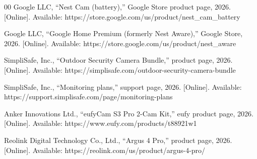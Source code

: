 \documentclass{ieeeaccess}
\begin{document}
\begin{thebibliography}{00}
 Google LLC, ``Nest Cam (battery),'' Google Store product page, 2026. [Online]. Available: https://store.google.com/us/product/nest\_cam\_battery

 Google LLC, ``Google Home Premium (formerly Nest Aware),'' Google Store, 2026. [Online]. Available: https://store.google.com/us/product/nest\_aware

 SimpliSafe, Inc., ``Outdoor Security Camera Bundle,'' product page, 2026. [Online]. Available: https://simplisafe.com/outdoor-security-camera-bundle

 SimpliSafe, Inc., ``Monitoring plans,'' support page, 2026. [Online]. Available: https://support.simplisafe.com/page/monitoring-plans

 Anker Innovations Ltd., ``eufyCam S3 Pro 2-Cam Kit,'' eufy product page, 2026. [Online]. Available: https://www.eufy.com/products/t88921w1

 Reolink Digital Technology Co., Ltd., ``Argus 4 Pro,'' product page, 2026. [Online]. Available: https://reolink.com/us/product/argus-4-pro/

\end{thebibliography}

\EOD
\end{document}
